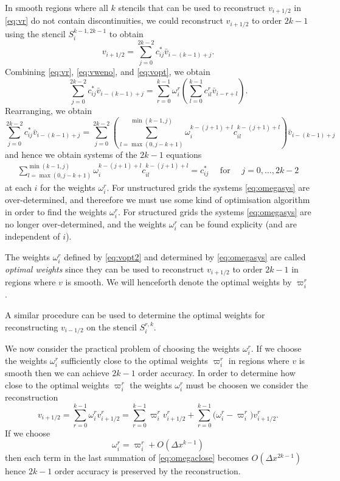 \documentclass{article}
\newcommand{\for}[0]{\quad \text{ for } \quad}
\newcommand{\vli}[0]{v_{i-1/2}}
\newcommand{\vri}[0]{v_{i+1/2}}
\numberwithin{equation}{section}
\begin{document}
In smooth regions where all $k$ stencils that can be used to
reconstruct $\vri$ in \eqref{eq:vr} do not contain discontinuities, we
could reconstruct $\vri$ to order $2k-1$ using the stencil
$S_i^{k-1,2k-1}$ to obtain
\begin{equation}
  \label{eq:vopt}
  \vri = \sum_{j=0}^{2k-2} c_{ij}^* \bar{v}_{i-(k-1)+j}.
\end{equation}
Combining \eqref{eq:vr}, \eqref{eq:vweno}, and \eqref{eq:vopt}, we
obtain
\begin{equation}
  \label{eq:vopt2}
  \sum_{j=0}^{2k-2} c_{ij}^* \bar{v}_{i-(k-1)+j}
    = \sum_{r=0}^{k-1} \omega_i^r \left( \sum_{l=0}^{k-1} c_{il}^r \bar{v}_{i-r+l} \right).
\end{equation}
Rearranging, we obtain
\begin{equation*}
  \sum_{j=0}^{2k-2} c_{ij}^* \bar{v}_{i-(k-1)+j}
    = \sum_{j=0}^{2k-2} \left(
      \sum_{l=\max(0,j-k+1)}^{\min(k-1,j)} \omega_i^{k-(j+1)+l} c_{il}^{k-(j+1)+l}
    \right) \bar{v}_{i-(k-1)+j}
\end{equation*}
and hence we obtain systems of the $2k-1$ equations
\begin{gather}
  \label{eq:omegasys}
  \sum_{l=\max(0,j-k+1)}^{\min(k-1,j)} \omega_i^{k-(j+1)+l} c_{il}^{k-(j+1)+l} = c_{ij}^*
    \for j = 0,\ldots,2k-2
\end{gather}
at each $i$ for the weights $\omega_i^r$.  For unstructured grids the
systems \eqref{eq:omegasys} are over-determined, and thereefore we
must use some kind of optimisation algorithm in order to find the
weights $\omega_i^r$.  For structured grids the systems
\eqref{eq:omegasys} are no longer over-determined, and the weights
$\omega_i^r$ can be found explicity (and are independent of $i$).

The weights $\omega_i^r$ defined by \eqref{eq:vopt2} and determined by
\eqref{eq:omegasys} are called \emph{optimal weights} since they can
be used to reconstruct $\vri$ to order $2k-1$ in regions where $v$ is
smooth.  We will henceforth denote the optimal weights by
$\varpi_i^r$.

A similar procedure can be used to determine the optimal weights for
reconstructing $\vli$ on the stencil $S_i^{r,k}$.

We now consider the practical problem of choosing the weights
$\omega_i^r$.  If we choose the weights $\omega_i^r$ sufficiently
close to the optimal weights $\varpi_i^r$ in regions where $v$ is
smooth then we can achieve $2k-1$ order accuracy.  In order to
determine how close to the optimal weights $\varpi_i^r$ the weights
$\omega_i^r$ must be choosen we consider the reconstruction
\begin{equation}
  \label{eq:omegacloseeqn}
  \vri = \sum_{r=0}^{k-1} \omega_i^r \vri^r
    = \sum_{r=0}^{k-1} \varpi_i^r \vri^r
    + \sum_{r=0}^{k-1} \bigl( \omega_i^r - \varpi_i^r \bigr) \vri^r.
\end{equation}
If we choose
\begin{equation}
  \label{eq:omegaclose}
  \omega_i^r = \varpi_i^r + O(\Delta x^{k-1})
\end{equation}
then each term in the last summation of \eqref{eq:omegaclose} becomes
$O(\Delta x^{2k-1})$ hence $2k-1$ order accuracy is preserved by the
reconstruction.
\end{document}
